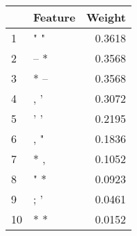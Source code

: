 \begin{tabular}{llr}
\toprule
{} & Feature &  Weight \\
\midrule
1  &     " " &  0.3618 \\
2  &    -- * &  0.3568 \\
3  &    * -- &  0.3568 \\
4  &     , ' &  0.3072 \\
5  &     ' ' &  0.2195 \\
6  &     , " &  0.1836 \\
7  &     * , &  0.1052 \\
8  &     " * &  0.0923 \\
9  &     ; ' &  0.0461 \\
10 &     * * &  0.0152 \\
\bottomrule
\end{tabular}
